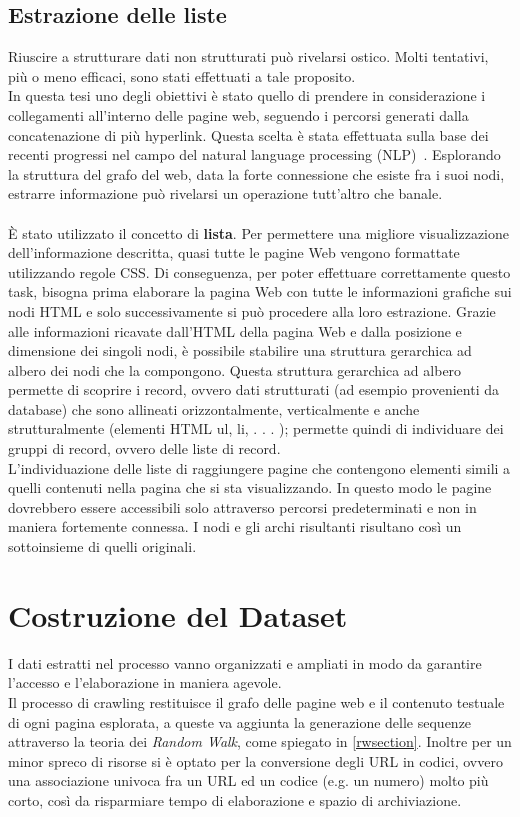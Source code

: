 \subsection{Estrazione delle liste}
\label{liste}
Riuscire a strutturare dati non strutturati può rivelarsi ostico. Molti tentativi, più o meno efficaci, sono stati effettuati a tale proposito.
\\
In questa tesi uno degli obiettivi è stato quello di prendere in considerazione i collegamenti all'interno delle pagine web, seguendo i percorsi generati dalla concatenazione di più hyperlink. Questa scelta è stata effettuata sulla base dei recenti progressi nel campo del natural language processing (NLP)~\cite{Turian10}. Esplorando la struttura del grafo del web, data la forte connessione che esiste fra i suoi nodi, estrarre informazione può rivelarsi un operazione tutt'altro che banale. 
\\\\
È stato utilizzato il concetto di \textbf{lista}. 
Per permettere una migliore visualizzazione dell'informazione descritta, quasi tutte le pagine Web vengono formattate utilizzando regole CSS. Di conseguenza, per poter effettuare correttamente questo task, bisogna prima elaborare la pagina Web con tutte le informazioni grafiche sui nodi HTML e solo successivamente si può procedere alla loro estrazione. Grazie alle informazioni ricavate dall’HTML della pagina Web e dalla posizione e dimensione dei singoli nodi, è possibile stabilire una struttura gerarchica ad albero dei nodi che la compongono. Questa struttura gerarchica ad albero permette di scoprire i record, ovvero dati strutturati (ad esempio provenienti da database) che sono allineati orizzontalmente, verticalmente e anche strutturalmente (elementi HTML ul, li, . . . ); permette quindi di individuare dei gruppi di record, ovvero delle liste di record.
\\
L’individuazione delle liste di raggiungere pagine che contengono elementi simili a quelli contenuti nella pagina che si sta visualizzando. 
In questo modo le pagine dovrebbero essere accessibili solo attraverso percorsi predeterminati e non in maniera fortemente connessa. I nodi e gli archi risultanti risultano così un sottoinsieme di quelli originali.

\section{Costruzione del Dataset}
I dati estratti nel processo vanno organizzati e ampliati in modo da garantire l'accesso e l'elaborazione in maniera agevole.
\\
Il processo di crawling restituisce il grafo delle pagine web e il contenuto testuale di ogni pagina esplorata, a queste va aggiunta la generazione delle sequenze attraverso la teoria dei \textit{Random Walk}, come spiegato in \ref{rwsection}. Inoltre per un minor spreco di risorse si è optato per la conversione degli URL in codici, ovvero una associazione univoca fra un URL ed un codice (e.g. un numero) molto più corto, così da risparmiare tempo di elaborazione e spazio di archiviazione.

